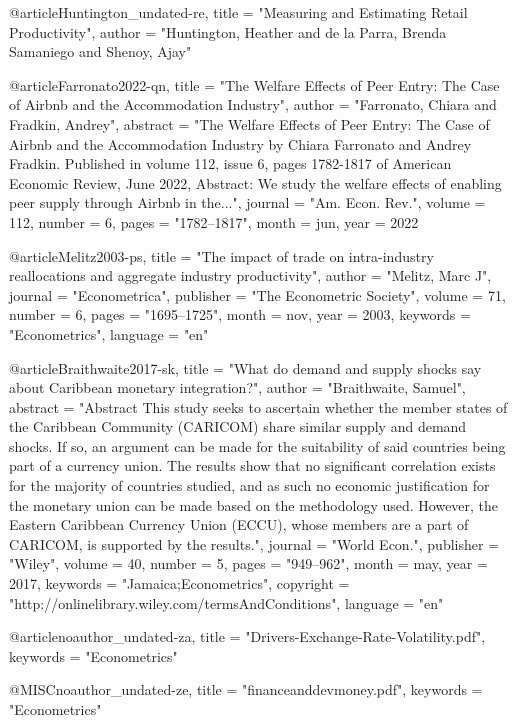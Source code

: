 {@article{Huntington_undated-re,
	title  = "Measuring and Estimating Retail Productivity",
	author = "Huntington, Heather and de la Parra, Brenda Samaniego and Shenoy,
	Ajay"
}

@article{Farronato2022-qn,
	title    = "The Welfare Effects of Peer Entry: The Case of Airbnb and the
	Accommodation Industry",
	author   = "Farronato, Chiara and Fradkin, Andrey",
	abstract = "The Welfare Effects of Peer Entry: The Case of Airbnb and the
	Accommodation Industry by Chiara Farronato and Andrey Fradkin.
	Published in volume 112, issue 6, pages 1782-1817 of American
	Economic Review, June 2022, Abstract: We study the welfare
	effects of enabling peer supply through Airbnb in the...",
	journal  = "Am. Econ. Rev.",
	volume   =  112,
	number   =  6,
	pages    = "1782--1817",
	month    =  jun,
	year     =  2022
}

@article{Melitz2003-ps,
	title     = "The impact of trade on intra-industry reallocations and
	aggregate industry productivity",
	author    = "Melitz, Marc J",
	journal   = "Econometrica",
	publisher = "The Econometric Society",
	volume    =  71,
	number    =  6,
	pages     = "1695--1725",
	month     =  nov,
	year      =  2003,
	keywords  = "Econometrics",
	language  = "en"
}

@article{Braithwaite2017-sk,
	title     = "What do demand and supply shocks say about Caribbean monetary
	integration?",
	author    = "Braithwaite, Samuel",
	abstract  = "Abstract This study seeks to ascertain whether the member states
	of the Caribbean Community (CARICOM) share similar supply and
	demand shocks. If so, an argument can be made for the
	suitability of said countries being part of a currency union.
	The results show that no significant correlation exists for the
	majority of countries studied, and as such no economic
	justification for the monetary union can be made based on the
	methodology used. However, the Eastern Caribbean Currency Union
	(ECCU), whose members are a part of CARICOM, is supported by the
	results.",
	journal   = "World Econ.",
	publisher = "Wiley",
	volume    =  40,
	number    =  5,
	pages     = "949--962",
	month     =  may,
	year      =  2017,
	keywords  = "Jamaica;Econometrics",
	copyright = "http://onlinelibrary.wiley.com/termsAndConditions",
	language  = "en"
}

@article{noauthor_undated-za,
	title    = "{Drivers-Exchange-Rate-Volatility.pdf}",
	keywords = "Econometrics"
}

@MISC{noauthor_undated-ze,
	title    = "financeanddevmoney.pdf",
	keywords = "Econometrics"
}

}
